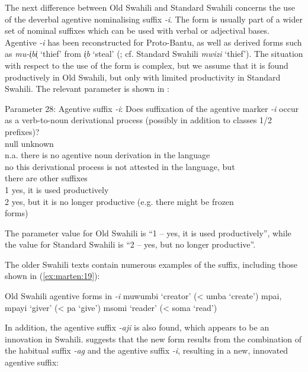 \documentclass[output=paper]{langscibook}
\begin{document}
The next difference between Old Swahili and Standard Swahili concerns the use of the deverbal agentive nominalising suffix \textit{{}-i}. The form is usually part of a wider set of nominal suffixes which can be used with verbal or adjectival bases. Agentive \textit{{}-i} has been reconstructed for Proto-Bantu, as well as derived forms such as \textit{mu-i̹bi̹} ‘thief’ from \textit{{}i̹b} ‘steal’ (\citealt[93]{Meeussen1967}; cf. Standard Swahili \textit{mwizi} ‘thief’). The situation with respect to the use of the form is complex, but we assume that it is found productively in Old Swahili, but only with limited productivity in Standard Swahili. The relevant parameter is shown in :

\ea\label{ex:marten:18}
Parameter 28: Agentive suffix \textit{{}-i}: Does suffixation of the agentive marker \textit{{}-i} occur as a verb-to-noun derivational process (possibly in addition to classes 1/2 prefixes)? \\
\glllllll null\hspace{1ex}    unknown\\
n.a.    {there is no agentive noun derivation in the language}\\
no     {this derivational process is not attested in the language, but}\\
{} {there are other suffixes}\\ 
1    {yes, it is used productively}\\ 
2      {yes, but it is no longer productive (e.g. there might be frozen}\\
{} {forms)}\\
\z

The parameter value for Old Swahili is ``1 -- yes, it is used productively'', while the value for Standard Swahili is ``2 -- yes, but no longer productive''.

The older Swahili texts contain numerous examples of the suffix, including those shown in (\ref{ex:marten:19}):

\ea
\label{ex:marten:19}Old Swahili agentive forms in \textit{{}-i} \citep[78]{Miehe1979}
    \ea\label{ex:marten:19a}    muwumbi           ‘creator’   (< umba ‘create’)
    \ex\label{ex:marten:19b}  mpai, mpayi        ‘giver’     (< pa ‘give’) 
    \ex\label{ex:marten:19c}  msomi             ‘reader’     (< soma ‘read’)
    \z
\z


In addition, the agentive suffix \textit{{}-aji} is also found, which appears to be an innovation in Swahili. \citet[11]{Schadeberg1992} suggests that the new form results from the combination of the habitual suffix \textit{{}-ag} and the agentive suffix \textit{{}-i}, resulting in a new, innovated agentive suffix:
\end{document}
